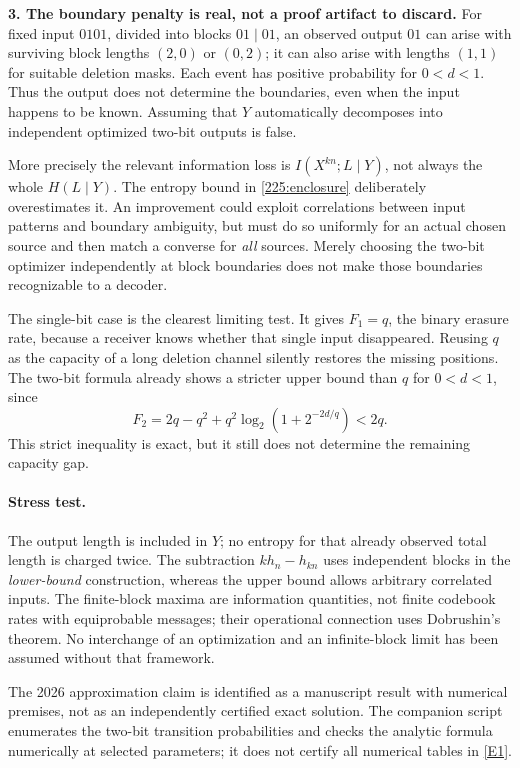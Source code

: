 \documentclass[11pt,a4paper]{article}
\newcommand{\eref}[2]{\hyperlink{extra:#1:#2}{[E#2]}}
\numberwithin{equation}{section}
\begin{document}
\textbf{3. The boundary penalty is real, not a proof artifact to discard.}
For fixed input $0101$, divided into blocks $01\mid01$, an observed
output $01$ can arise with surviving block lengths $(2,0)$ or $(0,2)$;
it can also arise with lengths $(1,1)$ for suitable deletion masks.
Each event has positive probability for $0<d<1$.
Thus the output does not determine the boundaries, even when the input
happens to be known. Assuming that $Y$ automatically decomposes into
independent optimized two-bit outputs is false.

More precisely the relevant information loss is
$I(X^{kn};L\mid Y)$, not always the whole $H(L\mid Y)$.
The entropy bound in \eqref{225:enclosure} deliberately overestimates it.
An improvement could exploit correlations between input patterns and
boundary ambiguity, but must do so uniformly for an actual chosen
source and then match a converse for \emph{all} sources. Merely choosing
the two-bit optimizer independently at block boundaries does not make
those boundaries recognizable to a decoder.

The single-bit case is the clearest limiting test. It gives
$F_1=q$, the binary erasure rate, because a receiver knows whether that
single input disappeared. Reusing $q$ as the capacity of a long deletion
channel silently restores the missing positions. The two-bit formula
already shows a stricter upper bound than $q$ for $0<d<1$, since
\[
 F_2=2q-q^2+q^2\log_2(1+2^{-2d/q})<2q.
\]
This strict inequality is exact, but it still does not determine the
remaining capacity gap.

\paragraph{Stress test.}
The output length is included in $Y$; no entropy for that already
observed total length is charged twice. The subtraction
$kh_n-h_{kn}$ uses independent blocks in the \emph{lower-bound}
construction, whereas the upper bound allows arbitrary correlated
inputs. The finite-block maxima are information quantities, not finite
codebook rates with equiprobable messages; their operational connection
uses Dobrushin's theorem. No interchange of an optimization and an
infinite-block limit has been assumed without that framework.

The 2026 approximation claim is identified as a manuscript result with
numerical premises, not as an independently certified exact solution.
The companion script enumerates the two-bit transition probabilities
and checks the analytic formula numerically at selected parameters; it
does not certify all numerical tables in \eref{225}{1}.
\end{document}
